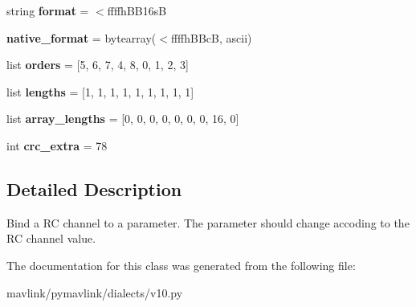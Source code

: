 \begin{DoxyCompactItemize}
\item 
\mbox{\label{classpymavlink_1_1dialects_1_1v10_1_1MAVLink__param__map__rc__message_a87bca7eb18b116d2bcbbb472dedc89e7}} 
string {\bfseries format} = \textquotesingle{}$<$ffffh\+B\+B16sB\textquotesingle{}
\item 
\mbox{\label{classpymavlink_1_1dialects_1_1v10_1_1MAVLink__param__map__rc__message_a04d45b5e02b267cce788e0190581f41e}} 
{\bfseries native\+\_\+format} = bytearray(\textquotesingle{}$<$ffffh\+B\+BcB\textquotesingle{}, \textquotesingle{}ascii\textquotesingle{})
\item 
\mbox{\label{classpymavlink_1_1dialects_1_1v10_1_1MAVLink__param__map__rc__message_aad8fc7c8d62a7b953a6c6f41c6bad28a}} 
list {\bfseries orders} = \mbox{[}5, 6, 7, 4, 8, 0, 1, 2, 3\mbox{]}
\item 
\mbox{\label{classpymavlink_1_1dialects_1_1v10_1_1MAVLink__param__map__rc__message_ab15caa82f657becff6ddfc2dc60e4035}} 
list {\bfseries lengths} = \mbox{[}1, 1, 1, 1, 1, 1, 1, 1, 1\mbox{]}
\item 
\mbox{\label{classpymavlink_1_1dialects_1_1v10_1_1MAVLink__param__map__rc__message_abb3c82f72b65e87e5d9290971ea07f6b}} 
list {\bfseries array\+\_\+lengths} = \mbox{[}0, 0, 0, 0, 0, 0, 0, 16, 0\mbox{]}
\item 
\mbox{\label{classpymavlink_1_1dialects_1_1v10_1_1MAVLink__param__map__rc__message_aaac96ab34822115214cbf5a24300cc5e}} 
int {\bfseries crc\+\_\+extra} = 78
\end{DoxyCompactItemize}


\subsection{Detailed Description}
\begin{DoxyVerb}Bind a RC channel to a parameter. The parameter should change
accoding to the RC channel value.
\end{DoxyVerb}
 

The documentation for this class was generated from the following file\+:\begin{DoxyCompactItemize}
\item 
mavlink/pymavlink/dialects/v10.\+py\end{DoxyCompactItemize}

